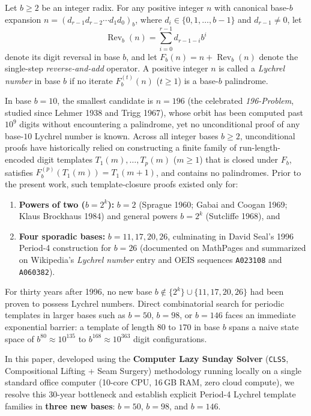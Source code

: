 \documentclass[11pt,a4paper]{article}
\theoremstyle{definition}
\theoremstyle{remark}
\begin{document}
Let $b \ge 2$ be an integer radix. For any positive integer $n$ with canonical base-$b$ expansion $n = (d_{r-1} d_{r-2} \cdots d_1 d_0)_b$, where $d_i \in \{0, 1, \dots, b-1\}$ and $d_{r-1} \neq 0$, let
\[
  \operatorname{Rev}_b(n) = \sum_{i=0}^{r-1} d_{r-1-i} b^i
\]
denote its digit reversal in base $b$, and let $F_b(n) = n + \operatorname{Rev}_b(n)$ denote the single-step \emph{reverse-and-add} operator. A positive integer $n$ is called a \emph{Lychrel number} in base $b$ if no iterate $F_b^{(t)}(n)$ ($t \ge 1$) is a base-$b$ palindrome.

In base $b = 10$, the smallest candidate is $n = 196$ (the celebrated \emph{196-Problem}, studied since Lehmer 1938 and Trigg 1967), whose orbit has been computed past $10^9$ digits without encountering a palindrome, yet no unconditional proof of any base-$10$ Lychrel number is known. Across all integer bases $b \ge 2$, unconditional proofs have historically relied on constructing a finite family of run-length-encoded digit templates $T_1(m), \dots, T_p(m)$ ($m \ge 1$) that is closed under $F_b$, satisfies $F_b^{(p)}(T_1(m)) = T_1(m+1)$, and contains no palindromes. Prior to the present work, such template-closure proofs existed only for:
\begin{enumerate}
  \item \textbf{Powers of two ($b = 2^k$):} $b = 2$ (Sprague 1960; Gabai and Coogan 1969; Klaus Brockhaus 1984) and general powers $b = 2^k$ (Sutcliffe 1968), and
  \item \textbf{Four sporadic bases:} $b = 11, 17, 20, 26$, culminating in David Seal's 1996 Period-4 construction for $b = 26$ (documented on MathPages and summarized on Wikipedia's \emph{Lychrel number} entry and OEIS sequences \texttt{A023108} and \texttt{A060382}).
\end{enumerate}

For thirty years after 1996, no new base $b \notin \{2^k\} \cup \{11, 17, 20, 26\}$ had been proven to possess Lychrel numbers. Direct combinatorial search for periodic templates in larger bases such as $b = 50$, $b = 98$, or $b = 146$ faces an immediate exponential barrier: a template of length $80$ to $170$ in base $b$ spans a naive state space of $b^{80} \approx 10^{135}$ to $b^{168} \approx 10^{363}$ digit configurations.

In this paper, developed using the \textbf{Computer Lazy Sunday Solver} (\texttt{CLSS}, Compositional Lifting + Seam Surgery) methodology \cite{mizopl2026clss} running locally on a single standard office computer (10-core CPU, 16\,GB RAM, zero cloud compute), we resolve this 30-year bottleneck and establish explicit Period-4 Lychrel template families in \textbf{three new bases}: $b = 50$, $b = 98$, and $b = 146$.
\end{document}
